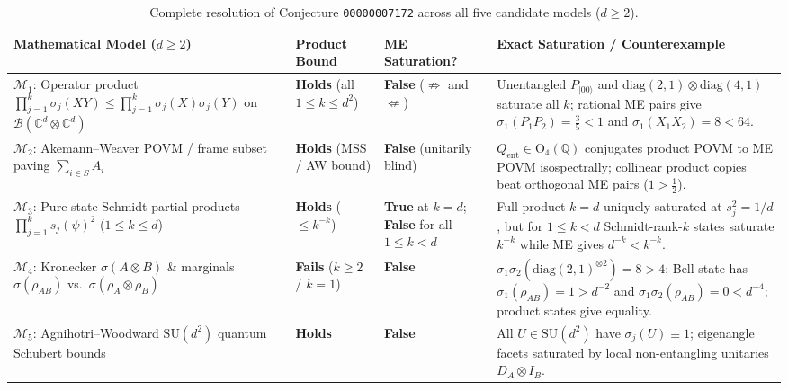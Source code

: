 \documentclass[11pt,a4paper]{article}
\theoremstyle{plain}
\theoremstyle{definition}
\newcommand{\C}{\mathbb{C}}
\newcommand{\Q}{\mathbb{Q}}
\newcommand{\cB}{\mathcal{B}}
\newcommand{\diag}{\mathrm{diag}}
\newcommand{\SU}{\mathrm{SU}}
\newcommand{\Orth}{\mathrm{O}}
\begin{document}
\begin{table}[ht!]
\centering
\small
\renewcommand{\arraystretch}{1.26}
\begin{tabular}{@{}>{\raggedright\arraybackslash}p{4.15cm}>{\raggedright\arraybackslash}p{2.2cm}>{\raggedright\arraybackslash}p{2.55cm}>{\raggedright\arraybackslash}p{5.4cm}@{}}
\hline
\textbf{Mathematical Model ($d \ge 2$)} & \textbf{Product Bound} & \textbf{ME Saturation?} & \textbf{Exact Saturation / Counterexample} \\
\hline
$\mathcal{M}_1$: Operator product $\prod_{j=1}^k \sigma_j(XY) \le \prod_{j=1}^k \sigma_j(X)\sigma_j(Y)$ on $\cB(\C^d \otimes \C^d)$ & \textbf{Holds} (all $1 \le k \le d^2$) & \textbf{False} ($\not\Rightarrow$ and $\not\Leftarrow$) & Unentangled $P_{|00\rangle}$ and $\diag(2,1)\otimes\diag(4,1)$ saturate all $k$; rational ME pairs give $\sigma_1(P_1 P_2) = \frac{3}{5} < 1$ and $\sigma_1(X_1 X_2) = 8 < 64$. \\
\hline
$\mathcal{M}_2$: Akemann--Weaver POVM / frame subset paving $\sum_{i \in S} A_i$ & \textbf{Holds} (MSS / AW bound) & \textbf{False} (unitarily blind) & $Q_{\mathrm{ent}} \in \Orth_4(\Q)$ conjugates product POVM to ME POVM isospectrally; collinear product copies beat orthogonal ME pairs ($1 > \frac{1}{2}$). \\
\hline
$\mathcal{M}_3$: Pure-state Schmidt partial products $\prod_{j=1}^k s_j(\psi)^2$ ($1 \le k \le d$) & \textbf{Holds} ($\le k^{-k}$) & \textbf{True} at $k=d$; \textbf{False} for all $1 \le k < d$ & Full product $k=d$ uniquely saturated at $s_j^2 = 1/d$, but for $1 \le k < d$ Schmidt-rank-$k$ states saturate $k^{-k}$ while ME gives $d^{-k} < k^{-k}$. \\
\hline
$\mathcal{M}_4$: Kronecker $\sigma(A \otimes B)$ \& marginals $\sigma(\rho_{AB})$ vs.\ $\sigma(\rho_A \otimes \rho_B)$ & \textbf{Fails} ($k \ge 2$ / $k=1$) & \textbf{False} & $\sigma_1\sigma_2(\diag(2,1)^{\otimes 2}) = 8 > 4$; Bell state has $\sigma_1(\rho_{AB}) = 1 > d^{-2}$ and $\sigma_1\sigma_2(\rho_{AB}) = 0 < d^{-4}$; product states give equality. \\
\hline
$\mathcal{M}_5$: Agnihotri--Woodward $\SU(d^2)$ quantum Schubert bounds & \textbf{Holds} & \textbf{False} & All $U \in \SU(d^2)$ have $\sigma_j(U) \equiv 1$; eigenangle facets saturated by local non-entangling unitaries $D_A \otimes I_B$. \\
\hline
\end{tabular}
\caption{Complete resolution of Conjecture \texttt{00000007172} across all five candidate models ($d \ge 2$).}
\label{tab:summary}
\end{table}
\end{document}
